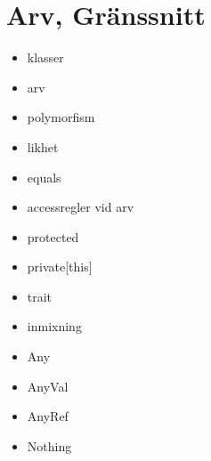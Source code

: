 \chapter{Arv, Gränssnitt}\label{chapter:W07}
\begin{itemize}[nosep]
\item klasser
\item arv
\item polymorfism
\item likhet
\item equals
\item accessregler vid arv
\item protected
\item private[this]
\item trait
\item inmixning
\item Any
\item AnyVal
\item AnyRef
\item Nothing
\end{itemize}
